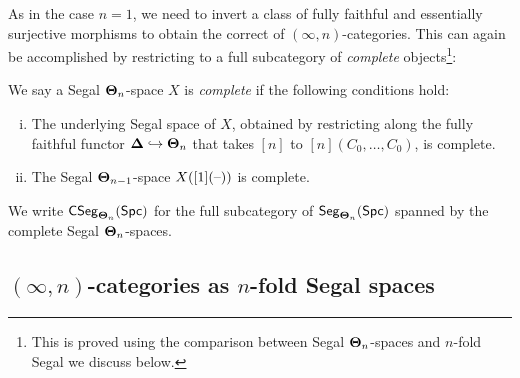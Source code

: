 \documentclass[a4paper,11pt]{article}
\begin{document}
\begin{remark}
  As in the case $n = 1$, we need to invert a class of fully faithful
  and essentially surjective morphisms to obtain the correct \icat{}
  of $(\infty,n)$-categories. This can again be accomplished by
  restricting to a full subcategory of \emph{complete}
  objects\footnote{This is proved using the comparison between Segal
    $\boldsymbol{\Theta}_{n}$-spaces and $n$-fold Segal we discuss below.}:
\end{remark}

\begin{defn}
  We say a Segal $\boldsymbol{\Theta}_{n}$-space $X$ is \emph{complete} if the
  following conditions hold:
  \begin{enumerate}[(i)]
  \item The underlying Segal space of $X$, obtained by restricting
    along the fully faithful functor $\boldsymbol{\Delta} \hookrightarrow \boldsymbol{\Theta}_{n}$
    that takes $[n]$ to $[n](C_{0},\dots,C_{0})$, is complete.
  \item The Segal $\boldsymbol{\Theta}_{n-1}$-space $X([1](\text{\textendash}))$ is complete.
  \end{enumerate}
  We write $\textup{\textsf{CSeg}}_{\boldsymbol{\Theta}_{n}}(\textup{\textsf{Spc}})$ for the full subcategory of
  $\textup{\textsf{Seg}}_{\boldsymbol{\Theta}_{n}}(\textup{\textsf{Spc}})$ spanned by the complete Segal $\boldsymbol{\Theta}_{n}$-spaces.
\end{defn}

\subsection{$(\infty,n)$-categories as $n$-fold Segal
  spaces}\label{subsec:nfold}
\end{document}
